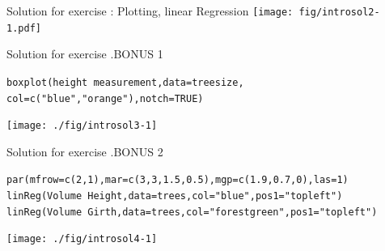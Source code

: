 \documentclass[xcolor=table,           xcolor=dvipsnames]{beamer}\usepackage[]{graphicx}\usepackage[]{color}
\makeatletter
\newcommand{\hlnum}[1]{\textcolor[rgb]{0,0,0}{#1}}
\newcommand{\hlstr}[1]{\textcolor[rgb]{0.545,0.137,0.137}{#1}}
\newcommand{\hlopt}[1]{\textcolor[rgb]{0,0,0}{#1}}
\newcommand{\hlstd}[1]{\textcolor[rgb]{0,0,0}{#1}}
\newcommand{\hlkwc}[1]{\textcolor[rgb]{1,0,1}{#1}}
\newcommand{\hlkwd}[1]{\textcolor[rgb]{0,0,1}{#1}}
\newenvironment{kframe}{%
 \def\at@end@of@kframe{}%
 \ifinner\ifhmode%
  \def\at@end@of@kframe{\end{minipage}}%
  \begin{minipage}{\columnwidth}%
 \fi\fi%
 \def\FrameCommand##1{\hskip\@totalleftmargin \hskip-\fboxsep
 \colorbox{shadecolor}{##1}\hskip-\fboxsep
     \hskip-\linewidth \hskip-\@totalleftmargin \hskip\columnwidth}%
 \MakeFramed {\advance\hsize-\width
   \@totalleftmargin\z@ \linewidth\hsize
   \@setminipage}}%
 {\par\unskip\endMakeFramed%
 \at@end@of@kframe}
\newenvironment{knitrout}{}{} %
\newcounter{exercisecount}
\makeatother
\begin{document}

\begin{frame}[fragile]{Solution for exercise : Plotting, linear Regression}
\texttt{[image: fig/introsol2-1.pdf]}
\end{frame}


\begin{frame}[fragile]{Solution for exercise .BONUS 1}
\begin{knitrout}
\color{fgcolor}\begin{kframe}
\begin{alltt}
\hlkwd{boxplot}\hlstd{(height}\hlopt{~}\hlstd{measurement,} \hlkwc{data}\hlstd{=treesize,}
        \hlkwc{col}\hlstd{=}\hlkwd{c}\hlstd{(}\hlstr{"blue"}\hlstd{,}\hlstr{"orange"}\hlstd{),} \hlkwc{notch}\hlstd{=}\hlnum{TRUE}\hlstd{)}
\end{alltt}
\end{kframe}

{\centering \texttt{[image: ./fig/introsol3-1]} 

}



\end{knitrout}
\end{frame}


\begin{frame}[fragile]{Solution for exercise .BONUS 2}
\begin{knitrout}\scriptsize
{}\color{fgcolor}\begin{kframe}
\begin{alltt}
\hlkwd{par}\hlstd{(}\hlkwc{mfrow}\hlstd{=}\hlkwd{c}\hlstd{(}\hlnum{2}\hlstd{,}\hlnum{1}\hlstd{),} \hlkwc{mar}\hlstd{=}\hlkwd{c}\hlstd{(}\hlnum{3}\hlstd{,}\hlnum{3}\hlstd{,}\hlnum{1.5}\hlstd{,}\hlnum{0.5}\hlstd{),} \hlkwc{mgp}\hlstd{=}\hlkwd{c}\hlstd{(}\hlnum{1.9}\hlstd{,}\hlnum{0.7}\hlstd{,}\hlnum{0}\hlstd{),} \hlkwc{las}\hlstd{=}\hlnum{1}\hlstd{)}
\hlkwd{linReg}\hlstd{(Volume}\hlopt{~}\hlstd{Height,} \hlkwc{data}\hlstd{=trees,} \hlkwc{col}\hlstd{=}\hlstr{"blue"}\hlstd{,} \hlkwc{pos1}\hlstd{=}\hlstr{"topleft"}\hlstd{)}
\hlkwd{linReg}\hlstd{(Volume}\hlopt{~}\hlstd{Girth,} \hlkwc{data}\hlstd{=trees,} \hlkwc{col}\hlstd{=}\hlstr{"forestgreen"}\hlstd{,} \hlkwc{pos1}\hlstd{=}\hlstr{"topleft"}\hlstd{)}
\end{alltt}
\end{kframe}

{\centering \texttt{[image: ./fig/introsol4-1]} 

}



\end{knitrout}
\end{frame}
\end{document}
